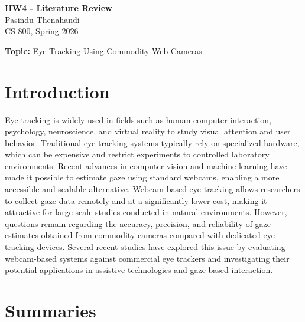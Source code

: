 \documentclass[12pt]{article}
\begin{document}
\begin{centering}
{\large\textbf{HW4 - Literature Review}}\\
\vspace{3mm} %
Pasindu Thenahandi\\
CS 800, Spring 2026\\
\end{centering}



\vspace{5mm}
\noindent\textbf{Topic:} Eye Tracking Using Commodity Web Cameras

\section{Introduction}


Eye tracking is widely used in fields such as human-computer interaction, psychology, neuroscience, and virtual reality to study visual attention and user behavior. Traditional eye-tracking systems typically rely on specialized hardware, which can be expensive and restrict experiments to controlled laboratory environments. Recent advances in computer vision and machine learning have made it possible to estimate gaze using standard webcams, enabling a more accessible and scalable alternative. Webcam-based eye tracking allows researchers to collect gaze data remotely and at a significantly lower cost, making it attractive for large-scale studies conducted in natural environments. However, questions remain regarding the accuracy, precision, and reliability of gaze estimates obtained from commodity cameras compared with dedicated eye-tracking devices. Several recent studies have explored this issue by evaluating webcam-based systems against commercial eye trackers and investigating their potential applications in assistive technologies and gaze-based interaction.

\section{Summaries}

\end{document}
